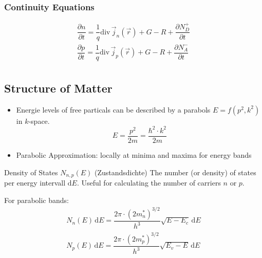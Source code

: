 \subsubsection{Continuity Equations}
\begin{align*}
  \dfrac{\partial n}{\partial t} = \dfrac{1}{q} \mathrm{div}\,\vec{j}_{n}(\vec{r}) + G - R + \dfrac{\partial N_{D}^{+}}{\partial t}\\
  \dfrac{\partial p}{\partial t} = \dfrac{1}{q} \mathrm{div}\,\vec{j}_{p}(\vec{r}) + G - R + \dfrac{\partial N_{A}^{-}}{\partial t}\\
\end{align*}

\subsection{Structure of Matter}
\begin{itemize}
  \item Energie levels of free particals can be described by a parabols $E = f(p^{2}, k^{2})$ in $k$-space.
        \begin{equation*}
          E = \dfrac{p^{2}}{2m} = \dfrac{\hbar^{2}\cdot k^{2}}{2m}
        \end{equation*}
  \item Parabolic Approximation: locally at minima and maxima for energy bands
\end{itemize}

\begin{definition}{Density of States $N_{n,p}(E)$ (Zustandsdichte)}
  The number (or density) of states per energy intervall $\mathrm{d}E$. Useful for calculating the number of carriers $n$ or $p$.

  For parabolic bands:
  \begin{align*}
    N_{n}(E) \, \mathrm{d}E = \dfrac{2\pi \cdot {(2m_{n}^{*})}^{3/2}}{h^{3}} \sqrt{E - E_{c}} \, \mathrm{d}E\\
    N_{p}(E) \, \mathrm{d}E = \dfrac{2\pi \cdot {(2m_{p}^{*})}^{3/2}}{h^{3}} \sqrt{E_{v} - E} \, \mathrm{d}E\\
  \end{align*}
\end{definition}

